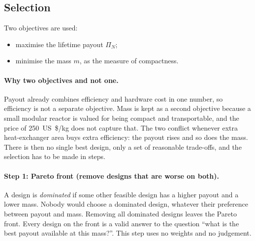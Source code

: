 
\subsection{Selection}
Two objectives are used:
\begin{itemize}
  \item maximise the lifetime payout $\Pi_N$;
  \item minimise the mass $m$, as the measure of compactness.
\end{itemize}

\paragraph{Why two objectives and not one.} Payout already combines efficiency and hardware cost in one number, so efficiency is not a separate objective. Mass is kept as a second objective because a small modular reactor is valued for being compact and transportable, and the price of \SI{250}{US\$/kg} does not capture that. The two conflict whenever extra heat-exchanger area buys extra efficiency: the payout rises and so does the mass. There is then no single best design, only a set of reasonable trade-offs, and the selection has to be made in steps.

\paragraph{Step 1: Pareto front (remove designs that are worse on both).} A design is \emph{dominated} if some other feasible design has a higher payout and a lower mass. Nobody would choose a dominated design, whatever their preference between payout and mass. Removing all dominated designs leaves the Pareto front. Every design on the front is a valid answer to the question ``what is the best payout available at this mass?''. This step uses no weights and no judgement.

